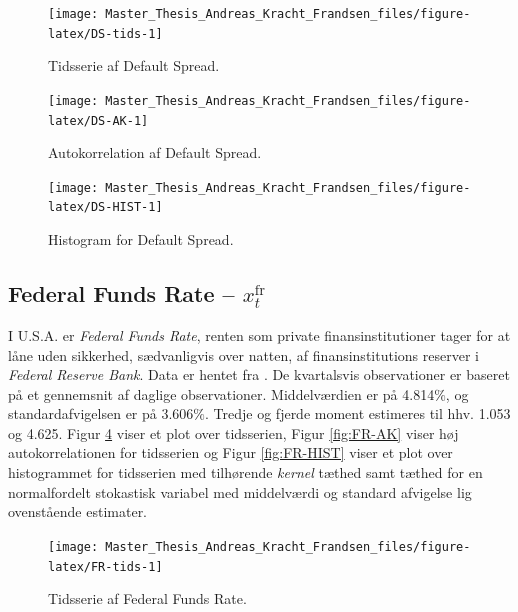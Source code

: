 \documentclass[
  a4paper,
  oneside]{memoir}
\begin{document}
\begin{figure}[H]

{\centering \texttt{[image: Master\_Thesis\_Andreas\_Kracht\_Frandsen\_files/figure-latex/DS-tids-1]} 

}

\caption{Tidsserie af Default Spread.}\label{fig:DS-tids}
\end{figure}

\begin{figure}[H]

{\centering \texttt{[image: Master\_Thesis\_Andreas\_Kracht\_Frandsen\_files/figure-latex/DS-AK-1]} 

}

\caption{Autokorrelation af Default Spread.}\label{fig:DS-AK}
\end{figure}

\begin{figure}[H]

{\centering \texttt{[image: Master\_Thesis\_Andreas\_Kracht\_Frandsen\_files/figure-latex/DS-HIST-1]} 

}

\caption{Histogram for Default Spread.}\label{fig:DS-HIST}
\end{figure}

\hypertarget{federal-funds-rate-x_ttextfr}{%
\subsection{\texorpdfstring{Federal Funds Rate -- \(x_t^{\text{fr}}\)}{Federal Funds Rate -- x\_t\^{}\{\textbackslash text\{fr\}\}}}\label{federal-funds-rate-x_ttextfr}}

I U.S.A. er \emph{Federal Funds Rate}, renten som private finansinstitutioner tager for at låne uden sikkerhed, sædvanligvis over natten, af finansinstitutions reserver i \emph{Federal Reserve Bank}. Data er hentet fra \citep{FREDF2020}. De kvartalsvis observationer er baseret på et gennemsnit af daglige observationer. Middelværdien er på 4.814\(\%\), og standardafvigelsen er på 3.606\(\%\). Tredje og fjerde moment estimeres til hhv. 1.053 og 4.625. Figur \ref{fig:FR-tids} viser et plot over tidsserien, Figur \ref{fig:FR-AK} viser høj autokorrelationen for tidsserien og Figur \ref{fig:FR-HIST} viser et plot over histogrammet for tidsserien med tilhørende \emph{kernel} tæthed samt tæthed for en normalfordelt stokastisk variabel med middelværdi og standard afvigelse lig ovenstående estimater.

\begin{figure}[H]

{\centering \texttt{[image: Master\_Thesis\_Andreas\_Kracht\_Frandsen\_files/figure-latex/FR-tids-1]} 

}

\caption{Tidsserie af Federal Funds Rate.}\label{fig:FR-tids}
\end{figure}
\end{document}

